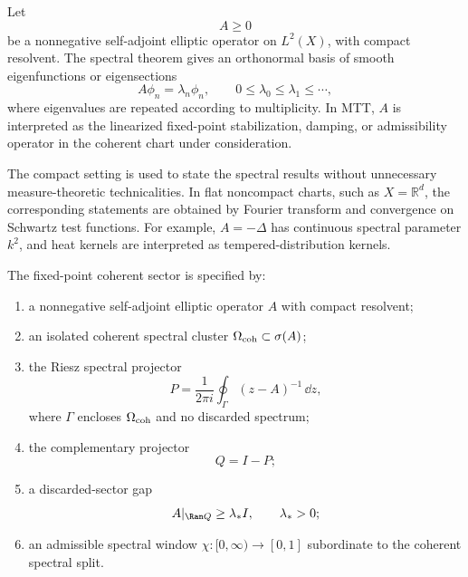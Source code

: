 \documentclass[11pt]{article}
\begin{document}
Let
\begin{equation}
  A\ge 0
\end{equation}
be a nonnegative self-adjoint elliptic operator on \(L^2(X)\), with compact resolvent. The
spectral theorem gives an orthonormal basis of smooth eigenfunctions or eigensections
\begin{equation}
  A\phi_n=\lambda_n\phi_n,
  \qquad
  0\le \lambda_0\le\lambda_1\le\cdots,
  \label{eq:A-spectrum}
\end{equation}
where eigenvalues are repeated according to multiplicity. In MTT, \(A\) is interpreted as the
linearized fixed-point stabilization, damping, or admissibility operator in the coherent chart
under consideration.

The compact setting is used to state the spectral results without unnecessary measure-theoretic
technicalities. In flat noncompact charts, such as \(X=\mathbb R^d\), the corresponding statements
are obtained by Fourier transform and convergence on Schwartz test functions. For example,
\(A=-\Delta\) has continuous spectral parameter \(k^2\), and heat kernels are interpreted as
tempered-distribution kernels.

\begin{assumption}
\label{ass:fixed-point-spectral-data}
The fixed-point coherent sector is specified by:
\begin{enumerate}[label=(\roman*)]
  \item a nonnegative self-adjoint elliptic operator \(A\) with compact resolvent;
  \item an isolated coherent spectral cluster \(\Omega_{\rm coh}\subset\sigma(A)\);
  \item the Riesz spectral projector
  \begin{equation}
    P
    =
    \frac{1}{2\pi i}
    \oint_\Gamma (z-A)^{-1}\,\dd z,
    \label{eq:riesz-P}
  \end{equation}
  where \(\Gamma\) encloses \(\Omega_{\rm coh}\) and no discarded spectrum;
  \item the complementary projector
  \begin{equation}
    Q=I-P;
  \end{equation}
  \item a discarded-sector gap
  \begin{equation}
    A|_{\Ran Q}\ge \lambda_\ast I,
    \qquad
    \lambda_\ast>0;
    \label{eq:discarded-gap}
  \end{equation}
  \item an admissible spectral window \(\chi:[0,\infty)\to[0,1]\) subordinate to the coherent
  spectral split.
\end{enumerate}
\end{assumption}
\end{document}

